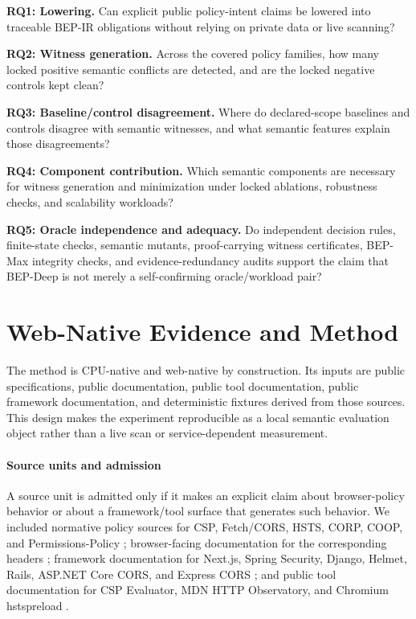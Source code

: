\documentclass[10pt,conference]{IEEEtran}
\newcommand{\bep}{BEP-IR}
\begin{document}
\textbf{RQ1: Lowering.} Can explicit public policy-intent claims be lowered into traceable \bep{} obligations without relying on private data or live scanning?

\textbf{RQ2: Witness generation.} Across the covered policy families, how many locked positive semantic conflicts are detected, and are the locked negative controls kept clean?

\textbf{RQ3: Baseline/control disagreement.} Where do declared-scope baselines and controls disagree with semantic witnesses, and what semantic features explain those disagreements?

\textbf{RQ4: Component contribution.} Which semantic components are necessary for witness generation and minimization under locked ablations, robustness checks, and scalability workloads?

\textbf{RQ5: Oracle independence and adequacy.} Do independent decision rules, finite-state checks, semantic mutants, proof-carrying witness certificates, BEP-Max integrity checks, and evidence-redundancy audits support the claim that BEP-Deep is not merely a self-confirming oracle/workload pair?

\section{Web-Native Evidence and Method}

The method is CPU-native and web-native by construction. Its inputs are public specifications, public documentation, public tool documentation, public framework documentation, and deterministic fixtures derived from those sources.  This design makes the experiment reproducible as a local semantic evaluation object rather than a live scan or service-dependent measurement.

\paragraph{Source units and admission}

A source unit is admitted only if it makes an explicit claim about browser-policy behavior or about a framework/tool surface that generates such behavior. We included normative policy sources for CSP, Fetch/CORS, HSTS, CORP, COOP, and Permissions-Policy \cite{w3c_csp3_2026,whatwg_fetch_2026,rfc6797_hsts,w3c_corp_2026,whatwg_html_coop_2026,w3c_permissions_policy_2026}; browser-facing documentation for the corresponding headers \cite{mdn_csp_header_2026,mdn_cors_2026,mdn_hsts_2026,mdn_coep_2026,mdn_permissions_policy_2026}; framework documentation for Next.js, Spring Security, Django, Helmet, Rails, ASP.NET Core CORS, and Express CORS \cite{nextjs_csp_2026,spring_security_headers_2026,django_security_middleware_2026,helmet_docs_2026,rails_csp_api_2026,aspnet_core_cors_2026,express_cors_2026}; and public tool documentation for CSP Evaluator, MDN HTTP Observatory, and Chromium hstspreload \cite{google_csp_evaluator_2026,mdn_http_observatory_2026,chromium_hstspreload_2025}.
\end{document}
